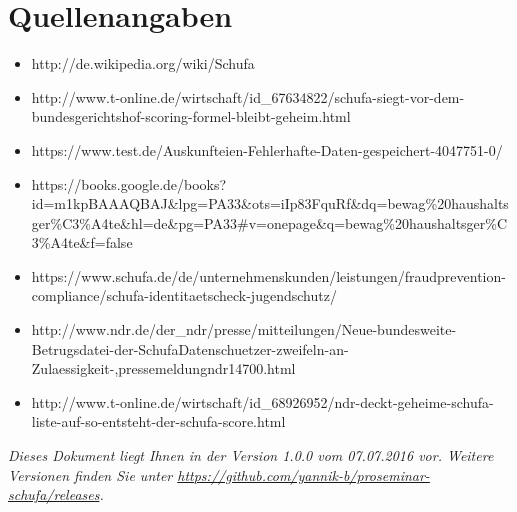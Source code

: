 \documentclass[12pt]{article}
\begin{document}
\section{Quellenangaben}
\begin{itemize}
\item http://de.wikipedia.org/wiki/Schufa
\item http://www.t-online.de/wirtschaft/id\_67634822/schufa-siegt-vor-dem-bundesgerichtshof-scoring-formel-bleibt-geheim.html
\item https://www.test.de/Auskunfteien-Fehlerhafte-Daten-gespeichert-4047751-0/
\item https://books.google.de/books?id=m1kpBAAAQBAJ\&lpg=PA33\&ots=iIp83FquRf\&dq=bewag\%20haushaltsger\%C3\%A4te\&hl=de\&pg=PA33\#v=onepage\&q=bewag\%20haushaltsger\%C3\%A4te\&f=false
\item https://www.schufa.de/de/unternehmenskunden/leistungen/fraudprevention-compliance/schufa-identitaetscheck-jugendschutz/
\item http://www.ndr.de/der\_ndr/presse/mitteilungen/Neue-bundesweite-Betrugsdatei-der-SchufaDatenschuetzer-zweifeln-an-Zulaessigkeit-,pressemeldungndr14700.html
\item http://www.t-online.de/wirtschaft/id\_68926952/ndr-deckt-geheime-schufa-liste-auf-so-entsteht-der-schufa-score.html
\end{itemize}

\begin{small}
\textit{Dieses Dokument liegt Ihnen in der Version 1.0.0 vom 07.07.2016 vor. Weitere Versionen finden Sie unter \href{url}{https://github.com/yannik-b/proseminar-schufa/releases}.}
\end{small}
\end{document}
